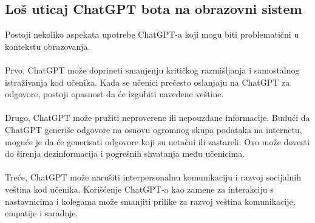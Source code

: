 \documentclass[fleqn, 12pt]{article}
\begin{document}
    \subsection{Loš uticaj ChatGPT bota na obrazovni sistem}
        \begin{text}
            Postoji nekoliko aspekata upotrebe ChatGPT-a koji mogu biti problematični u kontekstu obrazovanja\cite{G7}.
            \\\\
            Prvo, ChatGPT može doprineti smanjenju kritičkog razmišljanja i samostalnog istraživanja kod učenika. Kada se učenici prečesto oslanjaju na ChatGPT za odgovore, postoji opasnost da će izgubiti navedene veštine\cite{G7}.
            \\\\
            Drugo, ChatGPT može pružiti neproverene ili nepouzdane informacije. Budući da ChatGPT generiše odgovore na osnovu ogromnog skupa podataka na internetu, moguće je da će generisati odgovore koji su netačni ili zastareli. Ovo može dovesti do širenja dezinformacija i pogrešnih shvatanja među učenicima\cite{G7}.
            \\\\
            Treće, ChatGPT može narušiti interpersonalnu komunikaciju i razvoj socijalnih veština kod učenika. Korišćenje ChatGPT-a kao zamene za interakciju s nastavnicima i kolegama može smanjiti prilike za razvoj veština komunikacije, empatije i saradnje\cite{G7}.
        \end{text}
        
\newpage
\end{document}
